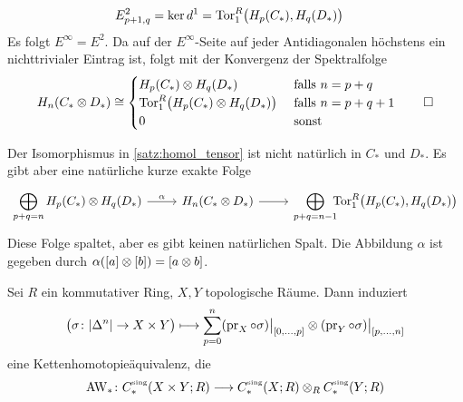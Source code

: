 \begin{beweis}
\begin{align}
		E^2_{p+1,q} &= \ker d^1 = \Tor_1^R \enbrace[\big]{H_p(C_*), H_q(D_*)}
	\end{align}
	Es folgt $E^\infty=E^2$.
	Da auf der $E^\infty$-Seite auf jeder Antidiagonalen höchstens ein nichttrivialer Eintrag ist, folgt mit der Konvergenz der Spektralfolge 
	\[
		H_{n}(C_* \otimes D_*) \cong \begin{cases}
			H_p(C_*) \otimes H_q(D_*) &\text{ falls }n=p+q\\
			\Tor_1^R \enbrace[\big]{H_p(C_*) \otimes H_q(D_*)} &\text{ falls } n=p+q+1 \\
			0 &\text{ sonst }  
		\end{cases}\qedhere
	\]
\end{beweis}

\begin{bemerkung}[{name=[{zur Natürlichkeit des Isomorphismus in \autoref{satz:homol_tensor}}]}]
	Der Isomorphismus in \autoref{satz:homol_tensor} ist nicht natürlich in $C_*$ und $D_*$.
	Es gibt aber eine natürliche kurze exakte Folge 
	\[
		\begin{tikzcd}
			\displaystyle\smashoperator[r]{\bigoplus_{p+q=n}}\enspace H_p (C_*) \otimes H_q (D_*) \rar["\alpha"] & H_n(C_* \otimes D_*) \rar &
			\displaystyle\smashoperator[r]{\bigoplus_{p+q=n-1}}\enspace \Tor_1^R \enbrace[\big]{H_p(C_*), H_q(D_*)}
		\end{tikzcd}
	\]
	Diese Folge spaltet, aber es gibt keinen natürlichen Spalt.
	Die Abbildung $\alpha$ ist gegeben durch $\alpha \enbrace*{[a] \otimes [b]} = \benbrace*{a \otimes b}$.
\end{bemerkung}

\begin{satz}[{name={Eilenberg-Zilber}},label=eilenbergzilber]
	Sei $R$ ein kommutativer Ring, $X,Y$ topologische Räume.
	Dann induziert 
	\[
		\enbrace[\big]{\sigma \colon \abs*{\Delta^n} \to X \times Y } \longmapsto \sum_{p=0}^{n} (\pr_X \circ \sigma)\big|_{\benbrace*{0,\ldots ,p}} \otimes (\pr_Y \circ \sigma)\big|_{\benbrace*{p,\ldots ,n}}
	\]
	eine Kettenhomotopieäquivalenz, die  
	\[
		\AW_* \colon C^\sing_*(X \times Y;R) \longrightarrow C_*^\sing(X;R) \otimes_R C_*^\sing(Y;R)
	\]
\end{satz}


